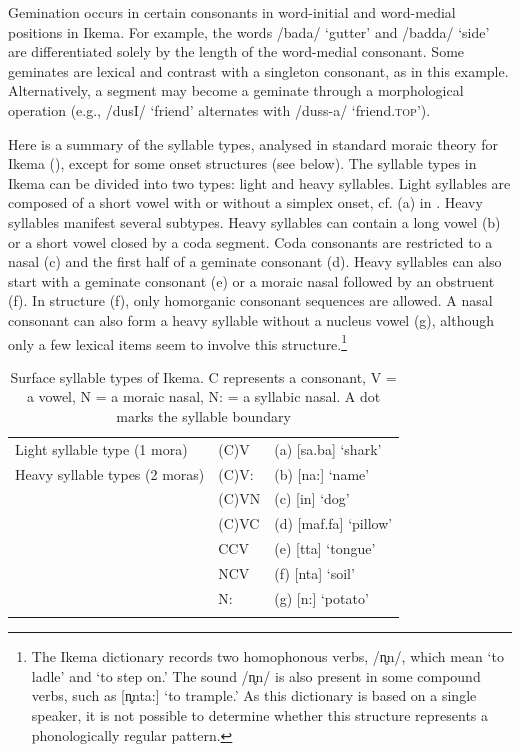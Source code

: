 \documentclass[output=paper]{langscibook}
\begin{document}
Gemination occurs in certain consonants in word-initial and word-medial positions in Ikema. For example, the words /bada/ ‘gutter’ and /badda/ ‘side’ are differentiated solely by the length of the word-medial consonant. Some geminates are lexical and contrast with a singleton consonant, as in this example. Alternatively, a segment may become a geminate through a morphological operation (e.g., /dusI/ ‘friend’ alternates with /duss-a/ ‘friend.\textsc{top}’).

\largerpage
Here is a summary of the syllable types, analysed in standard moraic theory \citep{Hayes1989} for Ikema (), except for some onset structures (see below). The syllable types in Ikema can be divided into two types: light and heavy syllables. Light syllables are composed of a short vowel with or without a simplex onset, cf. (a) in . Heavy syllables manifest several subtypes. Heavy syllables can contain a long vowel (b) or a short vowel closed by a coda segment. Coda consonants are restricted to a nasal (c) and the first half of a geminate consonant (d). Heavy syllables can also start with a geminate consonant (e) or a moraic nasal followed by an obstruent (f). In structure (f), only homorganic consonant sequences are allowed. A nasal consonant can also form a heavy syllable without a nucleus vowel (g), although only a few lexical items seem to involve this structure.\footnote{The Ikema dictionary \citep{NakamaEtAl2022} records two homophonous verbs, /n̥n/, which mean ‘to ladle’ and ‘to step on.’ The sound /n̥n/ is also present in some compound verbs, such as [n̥nta:] ‘to trample.’ As this dictionary is based on a single speaker, it is not possible to determine whether this structure represents a phonologically regular pattern.}

\begin{table}

\begin{tabularx}{\textwidth}{lXl}
\lsptoprule
Light syllable type (1 mora) & (C)V      &  (a) [sa.ba] ‘shark’\\
\tablevspace
Heavy syllable types (2 moras) & (C)V:   &  (b) [na:] ‘name’  \\
                                        &  (C)VN  &  (c) [in] ‘dog’        \\
                                        &  (C)VC  &  (d) [maf.fa] ‘pillow’ \\
                                        &  CCV    &  (e) [tta] ‘tongue’    \\
                                        &  NCV    &  (f) [nta] ‘soil’      \\
                                        &N:       &  (g) [n:] ‘potato’ \\
\lspbottomrule
\end{tabularx}
\caption{Surface syllable types of Ikema. C represents a consonant, V = a vowel, N = a moraic nasal, N: = a syllabic nasal. A dot marks the syllable boundary}
\label{tab:shinohara:3}
\end{table}
\end{document}
